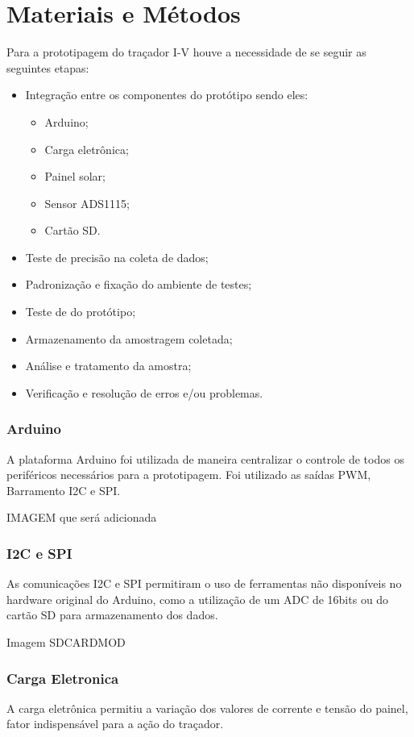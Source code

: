 \chapter{Materiais e Métodos}
\label{cap:03}

Para a prototipagem do traçador I-V houve a necessidade de se seguir as seguintes etapas:
\begin{itemize}
	\item Integração entre os componentes do protótipo sendo eles:
	\begin{itemize} 
		\item Arduino;
		\item Carga eletrônica;
		\item Painel solar;
		\item Sensor ADS1115;
		\item Cartão SD.
	\end{itemize}
	\item Teste de precisão na coleta de dados;
	\item Padronização e fixação do ambiente de testes;
	\item Teste de do protótipo;
	\item Armazenamento da amostragem coletada;
	\item Análise e tratamento da amostra;
	\item Verificação e resolução de erros e/ou problemas.

\end{itemize}

\subsection{Arduino}
A plataforma Arduino foi utilizada de maneira centralizar o controle de todos os periféricos necessários para a prototipagem. Foi utilizado as saídas PWM, Barramento I2C e SPI.

IMAGEM que será adicionada

\subsection{I2C e SPI}
As comunicações I2C e SPI permitiram o uso de ferramentas não disponíveis no hardware original do Arduino, como a utilização de um ADC de 16bits ou do cartão SD para armazenamento dos dados.

Imagem SDCARDMOD

\subsection{Carga Eletronica}
A carga eletrônica permitiu a variação dos valores de corrente e tensão do painel, fator indispensável para a ação do traçador.

